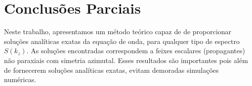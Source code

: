 \chapter{Conclus\~oes Parciais}

Neste trabalho, apresentamos um m\'etodo te\'orico capaz de de 
proporcionar solu\c{c}\~oes anal\'iticas exatas da equa\c{c}\~ao 
de onda, para qualquer tipo de espectro $S(k_z)$. As solu\c{c}\~oes 
encontradas correspondem a feixes escalares (propagantes) n\~ao paraxiais 
com simetria azimutal. Esses resultados s\~ao importantes pois al\'em de 
fornecerem solu\c{c}\~oes anal\'iticas exatas, evitam demoradas 
simula\c{c}\~oes num\'ericas.
